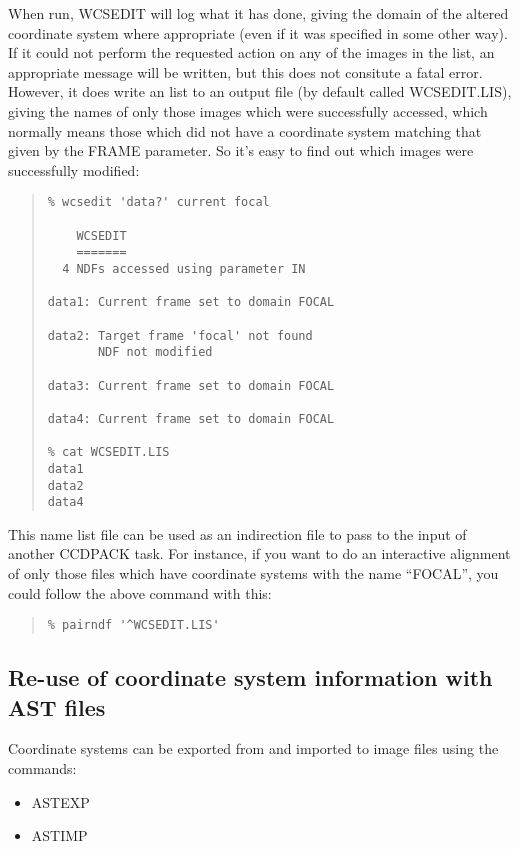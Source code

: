 \documentclass[twoside,11pt]{article}
\newcommand{\xlabel}[1]{}
\renewcommand{\_}{\texttt{\symbol{95}}}
\newenvironment{myquote}{\begin{quote}\begin{small}}{\end{small}\end{quote}}
\newcommand{\routine}[1]{{\sc #1}}
\begin{document}
When run, \routine{WCSEDIT} will log what it has done, 
giving the domain of the altered coordinate system where appropriate
(even if it was specified in some other way).
If it could not perform the requested action on any of the images
in the list, an appropriate message will be written, but this
does not consitute a fatal error.
However, it does write an list to an output file (by default called
WCSEDIT.LIS), giving the names of only those images 
which were successfully accessed, which normally
means those which did not have a coordinate system matching that
given by the FRAME parameter.  So it's easy to find out which 
images were successfully modified:
\begin{myquote}
\begin{verbatim}
% wcsedit 'data?' current focal

    WCSEDIT
    =======
  4 NDFs accessed using parameter IN

data1: Current frame set to domain FOCAL

data2: Target frame 'focal' not found
       NDF not modified

data3: Current frame set to domain FOCAL

data4: Current frame set to domain FOCAL

% cat WCSEDIT.LIS
data1
data2
data4
\end{verbatim}
\end{myquote}
This name list file can be used as an indirection file to pass to the 
input of another CCDPACK task.  For instance, if you want to do an
interactive alignment of only those files which have coordinate
systems with the name ``FOCAL'', you could follow the above command
with this:
\begin{myquote}
\begin{verbatim}
% pairndf '^WCSEDIT.LIS'
\end{verbatim}
\end{myquote}



\subsection{\xlabel{astfiles}\label{astfiles}Re-use of coordinate system
            information with AST files}

Coordinate systems can be exported from and imported to
image files using the commands:
\begin{itemize}
\item \routine{ASTEXP}
\item \routine{ASTIMP}
\end{itemize}
\end{document}
